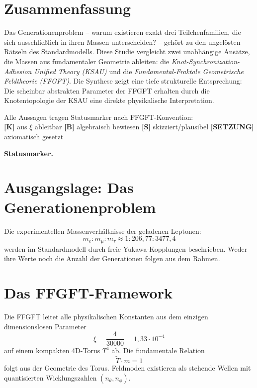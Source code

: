 
\section*{Zusammenfassung}

Das Generationenproblem -- warum existieren exakt drei Teilchenfamilien,
die sich ausschließlich in ihren Massen unterscheiden? -- gehört zu den
ungelösten Rätseln des Standardmodells. Diese Studie vergleicht zwei
unabhängige Ansätze, die Massen aus fundamentaler Geometrie ableiten:
die \emph{Knot-Synchronization-Adhesion Unified Theory (KSAU)} und die
\emph{Fundamental-Fraktale Geometrische Feldtheorie (FFGFT)}. Die
Synthese zeigt eine tiefe strukturelle Entsprechung: Die scheinbar
abstrakten Parameter der FFGFT erhalten durch die Knotentopologie der
KSAU eine direkte physikalische Interpretation.

\begin{keyresult}[Statusmarkierung]
Alle Aussagen tragen Statusmarker nach FFGFT-Konvention:\\
\textbf{[K]} aus $\xi$ ableitbar \quad
\textbf{[B]} algebraisch bewiesen \quad
\textbf{[S]} skizziert/plausibel \quad
\textbf{[SETZUNG]} axiomatisch gesetzt
\end{keyresult}

\medskip\noindent\textbf{Statusmarker.}


\section{Ausgangslage: Das Generationenproblem}

Die experimentellen Massenverhältnisse der geladenen Leptonen:
\begin{equation}
  m_e : m_\mu : m_\tau \approx 1 : 206{,}77 : 3477{,}4
\end{equation}
werden im Standardmodell durch freie Yukawa-Kopplungen beschrieben.
Weder ihre Werte noch die Anzahl der Generationen folgen aus dem Rahmen.

\section{Das FFGFT-Framework}

Die FFGFT leitet alle physikalischen Konstanten aus dem einzigen
dimensionslosen Parameter
\begin{equation}
  \xi = \frac{4}{30000} = 1{,}3\overline{3} \cdot 10^{-4}
\end{equation}
auf einem kompakten 4D-Torus $T^4$ ab. Die fundamentale Relation
\begin{equation}
  \tilde{T} \cdot m = 1
\end{equation}
folgt aus der Geometrie des Torus. Feldmoden existieren als stehende
Wellen mit quantisierten Wicklungszahlen $(n_\theta, n_\phi)$.


